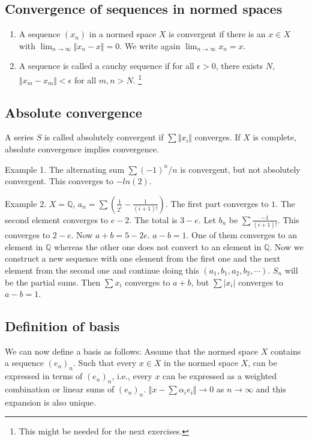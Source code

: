 \documentclass[11pt]{article}
\def\Q{\mathbb{Q}}
\begin{document}
\subsection{Convergence of sequences in normed spaces}
\label{sec:org4f17dc1}
\begin{enumerate}
\item A sequence \((x_n)\) in a normed space \(X\) is convergent if there is an \(x\in
      X\) with \(\lim_{n\rightarrow \infty} \Vert x_n - x\Vert = 0\). We write again
\(\lim_{n\rightarrow \infty} x_n = x\).
\item A sequence is called a cauchy sequence if for all \(\epsilon > 0\), there
exists \(N\), \(\Vert x_m - x_m \Vert < \epsilon\) for all \(m, n > N\). \footnote{This might be needed for the next exercises.}
\end{enumerate}
\subsection{Absolute convergence}
\label{sec:org7a73e52}
A series \(S\) is called absolutely convergent if \(\sum \Vert x_i \Vert\)
converges. If \(X\) is complete, absolute convergence implies convergence.

Example 1. The alternating sum \(\sum (-1)^n/n\) is convergent, but not
absolutely convergent. This converges to \(-ln(2)\).

Example 2. \(X = \Q\), \(a_n = \sum \left(\frac{1}{2^{i}} -
   \frac1{(i+1)!}\right)\). The first part converges to \(1\). The second element
converges to \(e-2\). The total is \(3-e\). Let \(b_n\) be \(\sum
   \frac{-1}{(i+1)!}\). This converges to \(2 - e\). Now \(a + b = 5 - 2e\). \(a - b =
   1\). One of them converges to an element in \(\Q\) whereas the other one does
not convert to an element in \(\Q\). Now we construct a new sequence with one
element from the first one and the next element from the second one and
continue doing this \((a_1, b_1, a_2, b_2, \cdots)\). \(S_n\) will be the partial
sums. Then \(\sum x_i\) converges to \(a+b\), but \(\sum \vert x_i \vert\)
converges to \(a - b = 1\).
\subsection{Definition of basis}
\label{sec:org4832150}
We can now define a basis as follows: Assume that the normed space \(X\)
contains a sequence \((e_n)_n\). Such that every \(x \in X\) in the normed space
\(X\), can be expressed in terms of \((e_n)_n\), i.e., every \(x\) can be expressed
as a weighted combination or linear sums of \((e_n)_n\). \(\Vert x - \sum
   \alpha_i e_i \Vert \rightarrow 0\) as \(n \rightarrow \infty\) and this
expansion is also unique.
\end{document}
